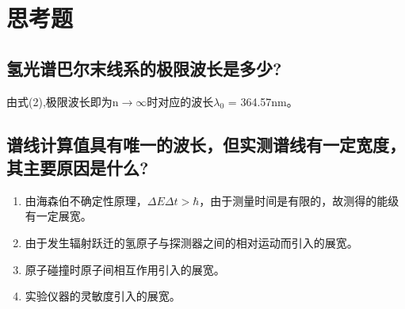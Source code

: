 \documentclass[a4paper]{article}
\begin{document}
\section{思考题}
\subsection{氢光谱巴尔末线系的极限波长是多少?}
由式(2),极限波长即为n$\to\infty$时对应的波长$\lambda_0$ = 364.57nm。
\subsection{谱线计算值具有唯一的波长，但实测谱线有一定宽度，其主要原因是什么? }
\begin{enumerate}
\item 由海森伯不确定性原理，$\Delta E\Delta t > \hbar$，由于测量时间是有限的，故测得的能级有一定展宽。
\item 由于发生辐射跃迁的氢原子与探测器之间的相对运动而引入的展宽。
\item 原子碰撞时原子间相互作用引入的展宽。
\item 实验仪器的灵敏度引入的展宽。
\end{enumerate}

\nocite{jiaocai}

\end{document}

